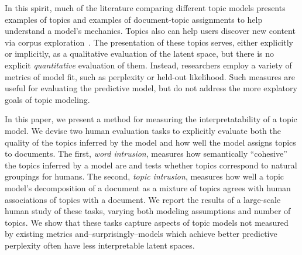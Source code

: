 In this spirit, much of the literature comparing different topic
models presents examples of topics and examples of document-topic
assignments to help understand a model's mechanics.  Topics also can
help users discover new content via corpus
exploration~\cite{mimno-07a}.  The presentation of these topics
serves, either explicitly or implicitly, as a qualitative evaluation
of the latent space, but there is no explicit \emph{quantitative}
evaluation of them.  Instead, researchers employ a variety of metrics
of model fit, such as perplexity or held-out likelihood.  Such
measures are useful for evaluating the predictive model, but do not
address the more explatory goals of topic modeling.

In this paper, we present a method for measuring the
interpretatability of a topic model.  We devise two human evaluation
tasks to explicitly evaluate both the quality of the topics inferred
by the model and how well the model assigns topics to documents.  The
first, \emph{word intrusion}, measures how semantically ``cohesive''
the topics inferred by a model are and tests whether topics correspond
to natural groupings for humans.  The second, \emph{topic intrusion},
measures how well a topic model's decomposition of a document as a
mixture of topics agrees with human associations of topics with a
document.  We report the results of a large-scale human study of these
tasks, varying both modeling assumptions and number of topics.  We
show that these tasks capture aspects of topic models not measured by
existing metrics and--surprisingly--models which achieve better
predictive perplexity often have less interpretable latent spaces.
